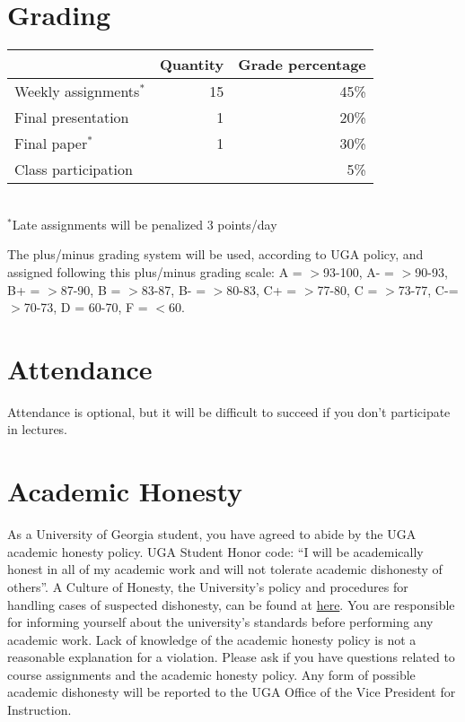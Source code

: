 \documentclass[12pt]{article}
\begin{document}
\section*{\normalsize Grading}
\vspace{-4mm}
\begin{center}
  \begin{tabular}[h!]{lrr}
    \hline
                           & Quantity & Grade percentage         \\
    \hline
    Weekly assignments$^*$ & 15       & 45\%                     \\
    Final presentation     & 1        & 20\%                     \\
    Final paper$^{*}$      & 1        & 30\%                     \\
    Class participation    &          & 5\%                      \\
    \hline
  \end{tabular}                                                  \\
  \small
\hspace{0mm} $^*$Late assignments will be penalized 3 points/day \\ 
\end{center}
The plus/minus grading system will be used, according to UGA policy,
and assigned following this plus/minus grading scale: A = $>$93-100,
A- = $>$90-93, B+ = $>$87-90, B = $>$83-87, B- = $>$80-83, C+ = $>$77-80,
C = $>$73-77, C-= $>$70-73, D = 60-70, F = $<$60. 


\vspace{-2mm}
\section*{\normalsize Attendance}
\vspace{-4mm}
Attendance is optional, but it will be difficult to succeed if you don't participate in lectures. 



\vspace{-2mm}
\section*{\normalsize Academic Honesty}
\vspace{-4mm}
As a University of Georgia student, you have agreed to abide by the
UGA academic honesty policy. UGA Student Honor code: ``I will be
academically honest in all of my academic work and will not tolerate
academic dishonesty of others''. A Culture of Honesty, the University's
policy and procedures for handling cases of suspected dishonesty, can
be found at \href{https://honesty.uga.edu/}{here}. You are responsible for
informing yourself about the university’s standards before performing
any academic work. Lack of knowledge of the academic honesty policy is
not a reasonable explanation for a violation. Please ask if you have
questions related to course assignments and the academic honesty
policy. Any form of possible academic dishonesty will be reported to
the UGA Office of the Vice President for Instruction.
\end{document}
